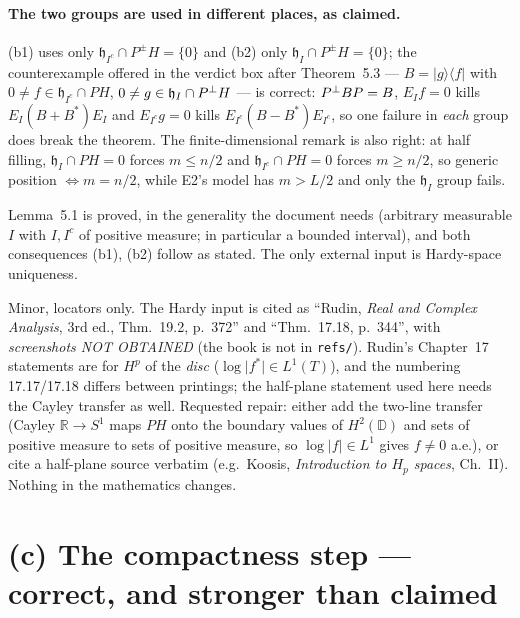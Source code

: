 \documentclass[11pt]{article}
\begin{document}
\paragraph{The two groups are used in different places, as claimed.}  (b1) uses only
$\mathfrak h_{I^c}\cap P^{\pm}H=\{0\}$ and (b2) only $\mathfrak h_{I}\cap P^{\pm}H=\{0\}$;
the counterexample offered in the verdict box after Theorem~5.3 --- $B=\lvert g\rangle\langle f\rvert$ with
$0\ne f\in\mathfrak h_{I^c}\cap PH$, $0\ne g\in\mathfrak h_I\cap P^{\perp} H$ --- is correct:
$P^{\perp} BP=B$, $E_If=0$ kills $E_I(B+B^*)E_I$ and $E_{I^c}g=0$ kills
$E_{I^c}(B-B^*)E_{I^c}$, so one failure in \emph{each} group does break the theorem.  The
finite-dimensional remark is also right: at half filling, $\mathfrak h_I\cap PH=0$ forces
$m\le n/2$ and $\mathfrak h_{I^c}\cap PH=0$ forces $m\ge n/2$, so generic position
$\iff m=n/2$, while E2's model has $m>L/2$ and only the $\mathfrak h_I$ group fails.

\begin{verdictok}
Lemma~5.1 is proved, in the generality the document needs (arbitrary measurable $I$ with
$I,I^c$ of positive measure; in particular a bounded interval), and both consequences
(b1), (b2) follow as stated.  The only external input is Hardy-space uniqueness.
\end{verdictok}

\begin{verdictgap}
Minor, locators only.  The Hardy input is cited as ``Rudin, \emph{Real and Complex
Analysis}, 3rd ed., Thm.~19.2, p.~372'' and ``Thm.~17.18, p.~344'', with
\emph{screenshots NOT OBTAINED} (the book is not in \texttt{refs/}).  Rudin's Chapter~17
statements are for $H^p$ of the \emph{disc} ($\log\lvert f^*\rvert\in L^1(T)$), and the
numbering 17.17/17.18 differs between printings; the half-plane statement used here needs
the Cayley transfer as well.  Requested repair: either add the two-line transfer (Cayley
$\mathbb R\to S^1$ maps $PH$ onto the boundary values of $H^2(\mathbb D)$ and sets of
positive measure to sets of positive measure, so $\log\lvert f\rvert\in L^1$ gives
$f\ne0$ a.e.), or cite a half-plane source verbatim (e.g.\ Koosis, \emph{Introduction to
$H_p$ spaces}, Ch.~II).  Nothing in the mathematics changes.
\end{verdictgap}

\section{(c) The compactness step --- correct, and stronger than claimed}\label{sec:c}
\end{document}
